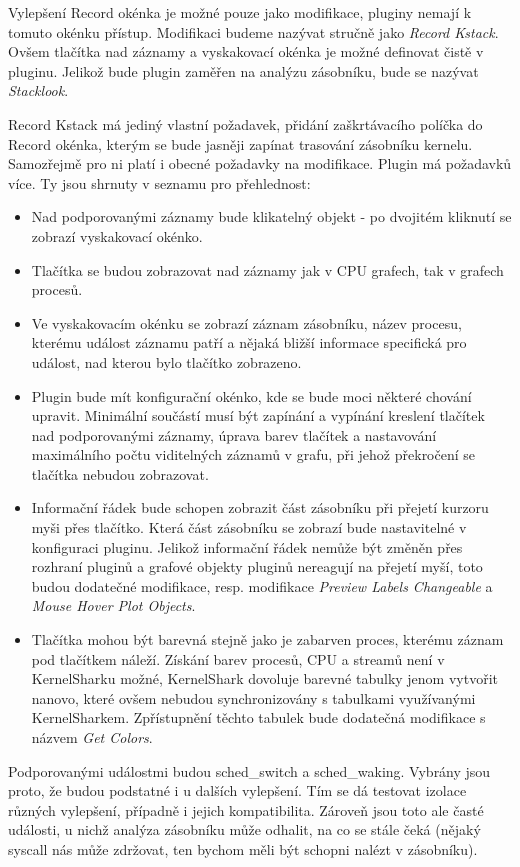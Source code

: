 Vylepšení Record okénka je možné pouze jako modifikace, pluginy nemají k tomuto okénku přístup. Modifikaci budeme nazývat stručně jako \emph{Record Kstack}. Ovšem tlačítka nad záznamy a vyskakovací okénka je možné definovat čistě v pluginu. Jelikož bude plugin zaměřen na analýzu zásobníku, bude se nazývat \emph{Stacklook}.

Record Kstack má jediný vlastní požadavek, přidání zaškrtávacího políčka do Record okénka, kterým se bude jasněji zapínat trasování zásobníku kernelu. Samozřejmě pro ni platí i obecné požadavky na modifikace. Plugin má požadavků více. Ty jsou shrnuty v seznamu pro přehlednost:
\begin{itemize}
    \item Nad podporovanými záznamy bude klikatelný objekt - po dvojitém kliknutí se zobrazí vyskakovací okénko.
    \item Tlačítka se budou zobrazovat nad záznamy jak v CPU grafech, tak v grafech procesů.
    \item Ve vyskakovacím okénku se zobrazí záznam zásobníku, název procesu, kterému událost záznamu patří a nějaká bližší informace specifická pro událost, nad kterou bylo tlačítko zobrazeno.
    \item Plugin bude mít konfigurační okénko, kde se bude moci některé chování upravit. Minimální součástí musí být zapínání a vypínání kreslení tlačítek nad podporovanými záznamy, úprava barev tlačítek a nastavování maximálního počtu viditelných záznamů v grafu, při jehož překročení se tlačítka nebudou zobrazovat.
    \item Informační řádek bude schopen zobrazit část zásobníku při přejetí kurzoru myši přes tlačítko. Která část zásobníku se zobrazí bude nastavitelné v konfiguraci pluginu. Jelikož informační řádek nemůže být změněn přes rozhraní pluginů a grafové objekty pluginů nereagují na přejetí myší, toto budou dodatečné modifikace, resp. modifikace \emph{Preview Labels Changeable} a \emph{Mouse Hover Plot Objects}.
    \item Tlačítka mohou být barevná stejně jako je zabarven proces, kterému záznam pod tlačítkem náleží. Získání barev procesů, CPU a streamů není v KernelSharku možné, KernelShark dovoluje barevné tabulky jenom vytvořit nanovo, které ovšem nebudou synchronizovány s tabulkami využívanými KernelSharkem. Zpřístupnění těchto tabulek bude dodatečná modifikace s názvem \emph{Get Colors}.
\end{itemize}

Podporovanými událostmi budou sched\_switch a sched\_waking. Vybrány jsou proto, že budou podstatné i u dalších vylepšení. Tím se dá testovat izolace různých vylepšení, případně i jejich kompatibilita. Zároveň jsou toto ale časté události, u nichž analýza zásobníku může odhalit, na co se stále čeká (nějaký syscall nás může zdržovat, ten bychom měli být schopni nalézt v zásobníku).

